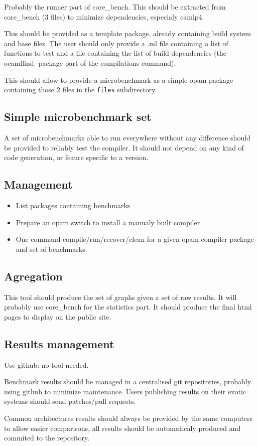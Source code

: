 \documentclass[11pt,a4paper]{article}
\begin{document}
Probably the runner part of core\_bench. This should be extracted from
core\_bench (3 files) to minimize dependencies, especialy camlp4.

This should be provided as a template package, already containing
build system and base files. The user should only provide a .ml file
containing a list of functions to test and a file containing the list
of build dependencies (the ocamlfind -package part of the compilations
command).

This should allow to provide a microbenchmark as a simple opam package
containing those 2 files in the \texttt{files} subdirectory.

\subsection{Simple microbenchmark set}

A set of microbenchmarks able to run everywhere without any difference
should be provided to reliably test the compiler. It should not depend
on any kind of code generation, or feaure specific to a version.

\subsection{Management}

\begin{itemize}
\item List packages containing benchmarks
\item Prepare an opam switch to install a manualy built compiler
\item One command compile/run/recover/clean for a given opam compiler
  package and set of benchmarks.
\end{itemize}

\subsection{Agregation}

This tool should produce the set of graphs given a set of raw
results. It will probably use core\_bench for the statistics part. It
should produce the final html pages to display on the public site.

\subsection{Results management}

Use github: no tool needed.

Benchmark results should be managed in a centralised git repositories,
probably using github to minimize maintenance. Users publishing
results on their exotic systems should send patches/pull requests.

Common architectures results should always be provided by the same
computers to allow easier comparisons, all results should be
automaticaly produced and commited to the repository.
\end{document}
